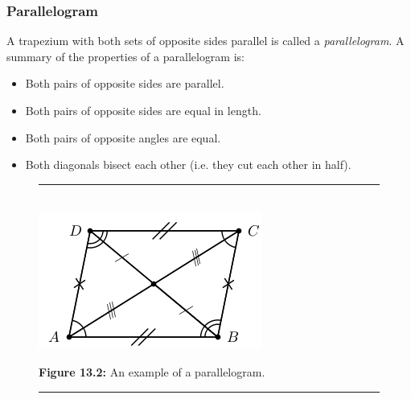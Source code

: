             \subsubsection{ Parallelogram}
            \nopagebreak
          \label{m39354*id318843}A trapezium with both sets of opposite sides parallel is called a \textsl{parallelogram}. A summary of the properties of a parallelogram is:\par 
          \label{m39354*id318853}\begin{itemize}[noitemsep]
            \label{m39354*uid57}\item Both pairs of opposite sides are parallel.
\label{m39354*uid58}\item Both pairs of opposite sides are equal in length.
\label{m39354*uid59}\item Both pairs of opposite angles are equal.
\label{m39354*uid60}\item Both diagonals bisect each other (i.e. they cut each other in half).
\end{itemize}
    \setcounter{subfigure}{0}
	\begin{figure}[H] %
    \begin{center}
    \rule[.1in]{\figurerulewidth}{.005in} \\
        \label{m39354*uid61!!!underscore!!!media}\label{m39354*uid61!!!underscore!!!printimage}\includegraphics{col11306.imgs/m39354_MG10C13_041.png} %
      \vspace{2pt}
    \vspace{\rubberspace}\par \begin{cnxcaption}
	  \small \textbf{Figure 13.2: }An example of a parallelogram.
	\end{cnxcaption}
    \vspace{.1in}
    \rule[.1in]{\figurerulewidth}{.005in} \\
    \end{center}
 \end{figure}       
        \label{m39354*uid62}
